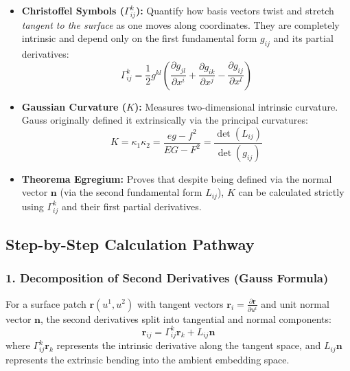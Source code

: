 \documentclass[11pt,a4paper]{article}
\begin{document}
	\begin{itemize}
		\item \textbf{Christoffel Symbols ($\Gamma_{ij}^k$):} Quantify how basis vectors twist and stretch \emph{tangent to the surface} as one moves along coordinates. They are completely intrinsic and depend only on the first fundamental form $g_{ij}$ and its partial derivatives:
		\begin{equation}
			\Gamma_{ij}^k = \frac{1}{2} g^{kl} \left( \frac{\partial g_{jl}}{\partial x^i} + \frac{\partial g_{ik}}{\partial x^j} - \frac{\partial g_{ij}}{\partial x^l} \right)
		\end{equation}
		
		\item \textbf{Gaussian Curvature ($K$):} Measures two-dimensional intrinsic curvature. Gauss originally defined it extrinsically via the principal curvatures:
		\begin{equation}
			K = \kappa_1 \kappa_2 = \frac{eg - f^2}{EG - F^2} = \frac{\det(L_{ij})}{\det(g_{ij})}
		\end{equation}
		
		\item \textbf{Theorema Egregium:} Proves that despite being defined via the normal vector $\mathbf{n}$ (via the second fundamental form $L_{ij}$), $K$ can be calculated strictly using $\Gamma_{ij}^k$ and their first partial derivatives.
	\end{itemize}
	
	\subsection{Step-by-Step Calculation Pathway}
	
	\subsubsection{1. Decomposition of Second Derivatives (Gauss Formula)}
	For a surface patch $\mathbf{r}(u^1, u^2)$ with tangent vectors $\mathbf{r}_i = \frac{\partial \mathbf{r}}{\partial u^i}$ and unit normal vector $\mathbf{n}$, the second derivatives split into tangential and normal components:
	\begin{equation}
		\mathbf{r}_{ij} = \Gamma_{ij}^k \mathbf{r}_k + L_{ij} \mathbf{n}
	\end{equation}
	where $\Gamma_{ij}^k \mathbf{r}_k$ represents the intrinsic derivative along the tangent space, and $L_{ij} \mathbf{n}$ represents the extrinsic bending into the ambient embedding space.
	
\end{document}
